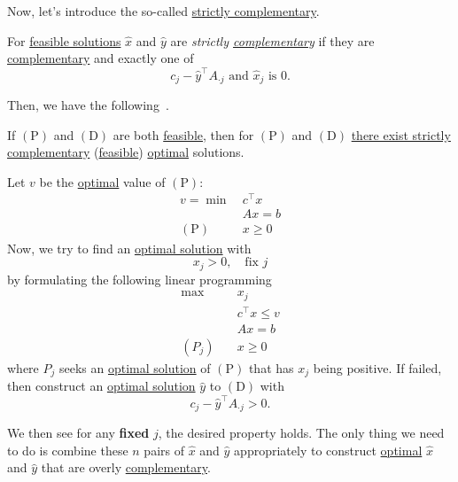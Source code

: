 Now, let's introduce the so-called \hyperref[def:strictly-complementary]{ strictly complementary}.

\begin{definition}\label{def:strictly-complementary}
	For \hyperref[def:feasible-solution]{feasible solutions} \(\hat{x}\) and \(\hat{y}\) are \emph{strictly \hyperref[def:complementary]{complementary}} if
	they are \hyperref[def:complementary]{complementary} and exactly one of
	\[
		c_{j} - \hat{y}^{\top}A_{\cdot j}\text{ and }\hat{x}_j \text{ is } 0.
	\]
\end{definition}

Then, we have the following~\cite[Exercise 5.5]{Linear-Opt}.

\begin{theorem}\label{thm:strictly-complementarity}
	If \((\mathrm{P})\) and \((\mathrm{D})\) are both \hyperref[def:feasible-solution]{feasible}, then for \((\mathrm{P})\) and \((\mathrm{D})\) \underline{there exist strictly}
	\hyperref[def:complementary]{complementary} (\hyperref[def:feasible-solution]{feasible}) \hyperref[def:optimal-solution]{optimal} solutions.
\end{theorem}

\begin{intuition}
	Let \(v\) be the \hyperref[def:optimal-solution]{optimal} value of \((\mathrm{P})\)\(\colon\)
	\[
		\begin{aligned}
			v = \min~         & c^{\top}x \\
			                  & Ax = b    \\
			(\mathrm{P})\quad & x\geq 0
		\end{aligned}
	\]
	Now, we try to find an \hyperref[def:optimal-solution]{optimal solution} with
	\[
		x_{j}>0, \quad \text{fix }j
	\]
	by formulating the following linear programming
	\[
		\begin{aligned}
			\max~      & x_{j}           \\
			           & c^{\top}x\leq v \\
			           & Ax = b          \\
			(P_j)\quad & x\geq  0
		\end{aligned}
	\]
	where \(P_{j}\) seeks an \hyperref[def:optimal-solution]{optimal solution} of \((\mathrm{P})\) that has \(x_{j}\) being positive.
	If failed, then construct an \hyperref[def:optimal-solution]{optimal solution} \(\hat{y}\) to \((\mathrm{D})\) with
	\[
		c_{j} - \hat{y}^{\top} A_{\cdot j}>0.
	\]

	We then see for any \textbf{fixed} \(j\), the desired property holds. The only thing we need to do is combine these \(n\) pairs of \(\hat{x}\) and \(\hat{y}\)
	appropriately to construct \hyperref[def:optimal-solution]{optimal} \(\hat{x}\) and \(\hat{y}\) that are overly \hyperref[def:complementary]{complementary}.
\end{intuition}